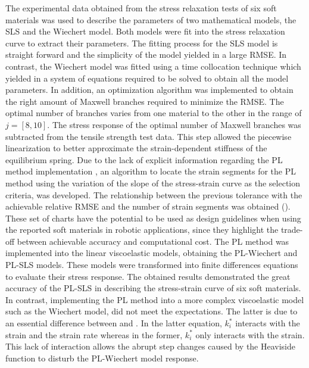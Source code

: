 The experimental data obtained from the stress relaxation tests of six soft materials was used to describe the parameters of two mathematical models, the SLS and the Wiechert model. Both models were fit into the stress relaxation curve to extract their parameters. The fitting process for the SLS model is straight forward and the simplicity of the model yielded in a large RMSE. In contrast, the Wiechert model was fitted using a time collocation technique which yielded in a system of equations required to be solved to obtain all the model parameters. In addition, an optimization algorithm was implemented to obtain the right amount of Maxwell branches required to minimize the RMSE. The optimal number of branches varies from one material to the other in the range of $j=[8,10]$. The stress response of the optimal number of Maxwell branches was subtracted from the tensile strength test data. This step allowed the piecewise linearization to better approximate the strain-dependent stiffness of the equilibrium spring. Due to the lack of explicit information regarding the PL method implementation \cite{austin2015control}, an algorithm to locate the strain segments for the PL method using the variation of the slope of the stress-strain curve as the selection criteria, was developed. The relationship between the previous tolerance with the achievable relative RMSE and the number of strain segments was obtained (). These set of charts have the potential to be used as design guidelines when using the reported soft materials in robotic applications, since they highlight the trade-off between achievable accuracy and computational cost. The PL method was implemented into the linear viscoelastic models, obtaining the PL-Wiechert and PL-SLS models. These models were transformed into finite differences equations to evaluate their stress response. The obtained results demonstrated the great accuracy of the PL-SLS in describing the stress-strain curve of six soft materials. In contrast, implementing the PL method into a more complex viscoelastic model such as the Wiechert model, did not meet the expectations. The latter is due to an essential difference between  and . In the latter equation, $k_i^*$ interacts with the strain and the strain rate whereas in the former, $k_i^*$ only interacts with the strain. This lack of interaction allows the abrupt step changes caused by the Heaviside function to disturb the PL-Wiechert model response.


